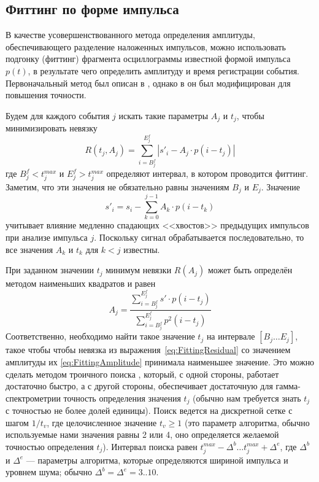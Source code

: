 
\subsection{Фиттинг по форме импульса}
\label{sec:FittingProcessing}

В качестве усовершенствованного метода определения амплитуды, обеспечивающего разделение наложенных импульсов, можно использовать подгонку (фиттинг) фрагмента осциллограммы известной формой импульса $p(t)$, в результате чего определить амплитуду и время регистрации события. Первоначальный метод был описан в \cite{Gin2008}, однако в \cite{Khilkevitch2020} он был модифицирован для повышения точности.

Будем для каждого события $j$ искать такие параметры $A_j$ и $t_j$, чтобы минимизировать невязку
\begin{equation}
  \label{eq:FittingResidual}
  R(t_j,A_j) =   \sum \limits_{i=B^f_j}^{E^f_j} \left| s'_i - A_j \cdot p( i - t_j ) \right|
\end{equation}
где $B^f_j < t_j^{max}$ и $E^f_j > t_j^{max}$ определяют интервал, в котором проводится фиттинг. Заметим, что эти значения не обязательно равны значениям $B_j$ и $E_j$. Значение 
\begin{equation*}
  s'_i = s_i - \sum \limits_{k=0}^{j-1} A_k \cdot p( i - t_k )
\end{equation*}
учитывает влияние медленно спадающих <<хвостов>> предыдущих импульсов при анализе импульса $j$. Поскольку сигнал обрабатывается последовательно, то все значения $A_k$ и $t_k$ для $k<j$ известны.

При заданном значении $t_j$ минимум невязки $R(A_j)$ может быть определён методом наименьших квадратов и равен
\begin{equation}
  \label{eq:FittingAmplitude}
  A_j = \frac{ \sum \limits_{i=B^f_j}^{E^f_j} s' \cdot p(i - t_j) }{ \sum \limits_{i=B^f_j}^{E^f_j} p^2(i-t_j) }
\end{equation}
Соответственно, необходимо найти такое значение $t_j$ на интервале $\left[ B_j \ldots E_j \right] $, такое чтобы чтобы невязка из выражения~\ref{eq:FittingResidual} со значением амплитуды их \ref{eq:FittingAmplitude} принимала наименьшее значение. Это можно сделать методом троичного поиска \cite{Scherer2017}, который, с одной стороны, работает достаточно быстро, а с другой стороны, обеспечивает достаточную для гамма-спектрометрии точность определения значения $t_j$ (обычно нам требуется знать $t_j$ с точностью не более долей единицы). Поиск ведется на дискретной сетке с шагом $1/t_v$, где целочисленное значение $t_v \ge 1$ (это параметр алгоритма, обычно используемые нами значения равны 2 или 4, оно определяется желаемой точностью определения $t_j$). Интервал поиска равен $ t_j^{max} - \Delta^b \ldots  t_j^{max} + \Delta^e$, где $\Delta^b$ и $\Delta^e$ --- параметры алгоритма, которые определяются шириной импульса и уровнем шума; обычно $\Delta^b = \Delta^e = 3..10$.


